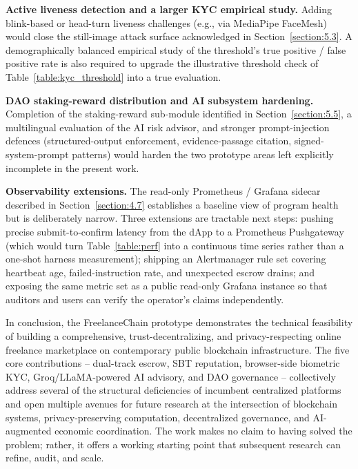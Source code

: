 \textbf{Active liveness detection and a larger KYC empirical study.} Adding blink-based or head-turn liveness challenges (e.g., via MediaPipe FaceMesh) would close the still-image attack surface acknowledged in Section~\ref{section:5.3}. A demographically balanced empirical study of the threshold's true positive / false positive rate is also required to upgrade the illustrative threshold check of Table~\ref{table:kyc_threshold} into a true evaluation.

\textbf{DAO staking-reward distribution and AI subsystem hardening.} Completion of the staking-reward sub-module identified in Section~\ref{section:5.5}, a multilingual evaluation of the AI risk advisor, and stronger prompt-injection defences (structured-output enforcement, evidence-passage citation, signed-system-prompt patterns) would harden the two prototype areas left explicitly incomplete in the present work.

\textbf{Observability extensions.} The read-only Prometheus / Grafana sidecar described in Section~\ref{section:4.7} establishes a baseline view of program health but is deliberately narrow. Three extensions are tractable next steps: pushing precise submit-to-confirm latency from the dApp to a Prometheus Pushgateway (which would turn Table~\ref{table:perf} into a continuous time series rather than a one-shot harness measurement); shipping an Alertmanager rule set covering heartbeat age, failed-instruction rate, and unexpected escrow drains; and exposing the same metric set as a public read-only Grafana instance so that auditors and users can verify the operator's claims independently.

In conclusion, the FreelanceChain prototype demonstrates the technical feasibility of building a comprehensive, trust-decentralizing, and privacy-respecting online freelance marketplace on contemporary public blockchain infrastructure. The five core contributions -- dual-track escrow, SBT reputation, browser-side biometric KYC, Groq/LLaMA-powered AI advisory, and DAO governance -- collectively address several of the structural deficiencies of incumbent centralized platforms and open multiple avenues for future research at the intersection of blockchain systems, privacy-preserving computation, decentralized governance, and AI-augmented economic coordination. The work makes no claim to having solved the problem; rather, it offers a working starting point that subsequent research can refine, audit, and scale.
